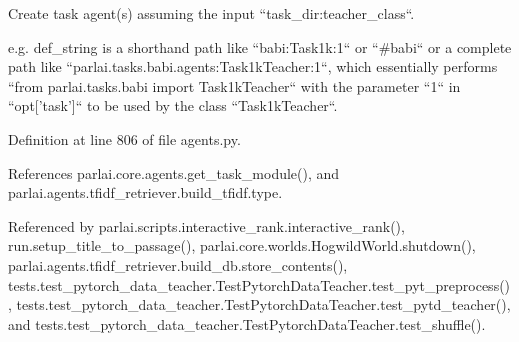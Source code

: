 \begin{DoxyVerb}Create task agent(s) assuming the input ``task_dir:teacher_class``.

e.g. def_string is a shorthand path like ``babi:Task1k:1`` or ``#babi``
or a complete path like ``parlai.tasks.babi.agents:Task1kTeacher:1``,
which essentially performs ``from parlai.tasks.babi import Task1kTeacher``
with the parameter ``1`` in ``opt['task']`` to be used by the class
``Task1kTeacher``.
\end{DoxyVerb}
 

Definition at line 806 of file agents.\+py.



References parlai.\+core.\+agents.\+get\+\_\+task\+\_\+module(), and parlai.\+agents.\+tfidf\+\_\+retriever.\+build\+\_\+tfidf.\+type.



Referenced by parlai.\+scripts.\+interactive\+\_\+rank.\+interactive\+\_\+rank(), run.\+setup\+\_\+title\+\_\+to\+\_\+passage(), parlai.\+core.\+worlds.\+Hogwild\+World.\+shutdown(), parlai.\+agents.\+tfidf\+\_\+retriever.\+build\+\_\+db.\+store\+\_\+contents(), tests.\+test\+\_\+pytorch\+\_\+data\+\_\+teacher.\+Test\+Pytorch\+Data\+Teacher.\+test\+\_\+pyt\+\_\+preprocess(), tests.\+test\+\_\+pytorch\+\_\+data\+\_\+teacher.\+Test\+Pytorch\+Data\+Teacher.\+test\+\_\+pytd\+\_\+teacher(), and tests.\+test\+\_\+pytorch\+\_\+data\+\_\+teacher.\+Test\+Pytorch\+Data\+Teacher.\+test\+\_\+shuffle().

